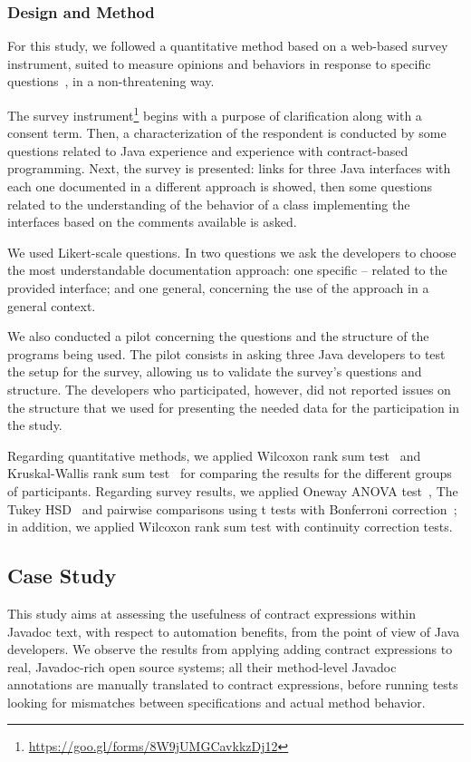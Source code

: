 \subsubsection{Design and Method}
\label{sec:surveyDes}

For this study, we followed a quantitative method based on a web-based survey instrument, suited to measure opinions and behaviors in response to specific questions~\cite{refSurvey}, in a non-threatening way. 

The survey
instrument\footnote{\url{https://goo.gl/forms/8W9jUMGCavkkzDj12}} begins with a purpose of clarification along with a consent term.
Then, a characterization of the respondent is conducted by some questions related to Java experience and experience with contract-based programming. Next, the survey is presented: links for three Java interfaces with each one documented in a different approach is showed, then some questions related to the understanding of the behavior of a class implementing the interfaces based on the comments available is asked. 

We used Likert-scale questions. In two questions we ask the developers to choose the most understandable documentation approach: one specific -- related to the provided interface; and one general, concerning the use of the approach in a general
context.

We also conducted a pilot concerning the questions and the structure of the programs being used. The pilot consists in asking three Java
developers to test the setup for the survey, allowing us to validate the survey's questions and structure. The developers who participated, however, did not reported issues on the structure that we used for presenting the needed data for the participation in the study.

Regarding quantitative methods, we applied Wilcoxon rank sum test~\cite{statistical} and Kruskal-Wallis rank sum test~\cite{statistical} for comparing the results for the different groups of participants. Regarding survey results, we applied Oneway ANOVA test~\cite{statistical}, The Tukey HSD~\cite{statistical} and pairwise comparisons using t tests with Bonferroni correction~\cite{statistical}; in addition, we applied Wilcoxon rank sum test with continuity correction tests.

\subsection{Case Study}
\label{sec:caseStudy}
This study aims at assessing the usefulness of contract expressions within Javadoc text, with respect to automation benefits, from the point of view of Java developers. 
We observe the results from applying adding contract expressions to \totalSystems{} real, Javadoc-rich open source systems; all their method-level Javadoc annotations are manually translated to contract expressions, before running tests looking for mismatches between specifications and actual method behavior.


